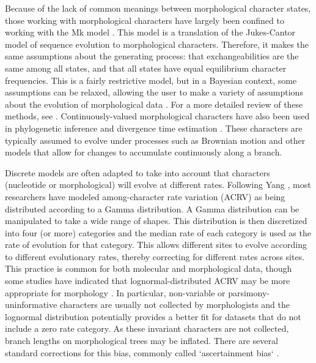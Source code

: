 Because of the lack of common meanings between morphological character states, those working with morphological characters have largely been confined to working with the Mk model \citep{Lewis2001}.
This model is a translation of the Jukes-Cantor model \citep{Jukes1969} of sequence evolution to morphological characters.
Therefore, it makes the same assumptions about the generating process: that exchangeabilities are the same among all states, and that all states have equal equilibrium character frequencies.
This is a fairly restrictive model, but in a Bayesian context, some assumptions can be relaxed, allowing the user to make a variety of assumptions about the evolution of morphological data \citep{Nylander2004, Wright2016}.
For a more detailed review of these methods, see \citep{Wright2019}. 
Continuously-valued morphological characters have also been used in phylogenetic inference \citep{goloboff2006, parins2017} and divergence time estimation \citep{AlvarezC2019}.
These characters are typically assumed to evolve under processes such as Brownian motion and other models that allow for changes to accumulate continuously along a branch.  


Discrete models are often adapted to take into account that characters (nucleotide or morphological) will evolve at different rates. Following Yang \citep{Yang1994a}, 
most researchers have modeled among-character rate variation (ACRV) as being distributed according to a Gamma distribution.
A Gamma distribution can be manipulated to take a wide range of shapes.
This distribution is then discretized into four (or more) categories and the median rate of each category is used as the rate of evolution for that category.
This allows different sites to evolve according to different evolutionary rates, thereby correcting for different rates across sites.
This practice is common for both molecular and morphological data, though some studies have indicated that lognormal-distributed ACRV may be more appropriate for morphology \citep{wagner2011, Harrison2015}. %
In particular, non-variable or parsimony-uninformative  characters are usually not collected by morphologists and the lognormal distribution potentially provides a better fit for datasets that do not include a zero rate category.
As these invariant characters are not collected, branch lengths on morphological trees may be inflated.
There are several standard corrections for this bias, commonly called `ascertainment bias` \citep{Lewis2001}.


